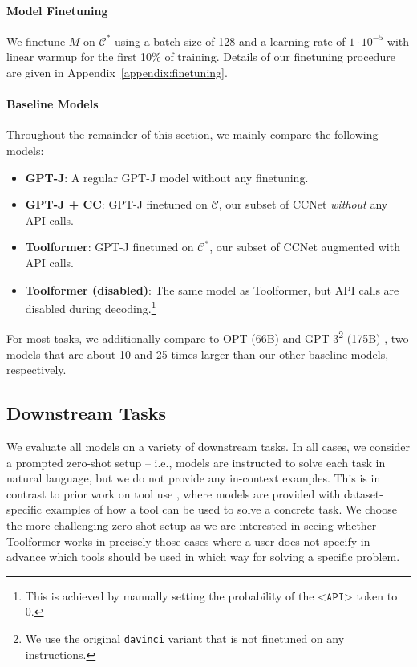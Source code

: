 \documentclass[11pt]{article}
\newcommand{\ours}[0]{Toolformer}
\begin{document}
\begin{CJK*}{UTF8}{gbsn}
\paragraph{Model Finetuning}
We finetune $M$ on $\mathcal{C}^*$ using a batch size of 128 and a learning rate of $1\cdot10^{-5}$ with linear warmup for the first 10\% of training. Details of our finetuning procedure are given in Appendix~\ref{appendix:finetuning}. 

\paragraph{Baseline Models}
Throughout the remainder of this section, we mainly compare the following models:

\begin{itemize}
\item \textbf{GPT-J}: A regular GPT-J model without any finetuning.
\item \textbf{GPT-J + CC}: GPT-J finetuned on $\mathcal{C}$, our subset of CCNet \emph{without} any API calls.
\item \textbf{\ours{}}: GPT-J finetuned on $\mathcal{C}^*$, our subset of CCNet augmented with API calls.
\item \textbf{\ours{} (disabled)}: The same model as \ours{}, but API calls are disabled during decoding.\footnote{This is achieved by manually setting the probability of the $\texttt{<API>}$ token to 0.}
\end{itemize}
For most tasks, we additionally compare to OPT (66B) \citep{zhang2022opt} and GPT-3\footnote{We use the original \texttt{davinci} variant that is not finetuned on any instructions.} (175B) \citep{brown2020language}, two models that are about 10 and 25 times larger than our other baseline models, respectively.

\subsection{Downstream Tasks}
\label{section:downstream-tasks}

We evaluate all models on a variety of downstream tasks. In all cases, we consider a prompted zero-shot setup -- i.e., models are instructed to solve each task in natural language, but we do not provide any in-context examples. This is in contrast to prior work on tool use \citep[e.g.,][]{gao2022pal,parisi2022talm}, where models are provided with dataset-specific examples of how a tool can be used to solve a concrete task. We choose the more challenging zero-shot setup as we are interested in seeing whether \ours{} works in precisely those cases where a user does not specify in advance which tools should be used in which way for solving a specific problem.


\end{CJK*}
\end{document}
